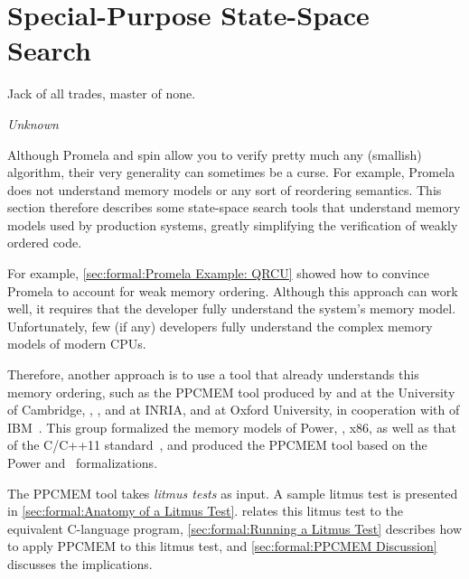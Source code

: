 
\section{Special-Purpose State-Space Search}
\label{sec:formal:Special-Purpose State-Space Search}
%
\epigraph{Jack of all trades, master of none.}{\emph{Unknown}}

Although Promela and spin allow you to verify pretty much any (smallish)
algorithm, their very generality can sometimes be a curse.
For example, Promela does not understand memory models or any sort
of reordering semantics.
This section therefore describes some state-space search tools that
understand memory models used by production systems, greatly simplifying the
verification of weakly ordered code.

For example,
\cref{sec:formal:Promela Example: QRCU}
showed how to convince Promela to account for weak memory ordering.
Although this approach can work well, it requires that the developer
fully understand the system's memory model.
Unfortunately, few (if any) developers fully understand the complex
memory models of modern CPUs.

Therefore, another approach is to use a tool that already understands
this memory ordering, such as the PPCMEM tool produced by
 and  at the University of Cambridge,
, , and
 at INRIA, and  at Oxford University,
in cooperation with  of
IBM~\cite{JadeAlglave2011ppcmem}.
This group formalized the memory models of Power, \ARM, x86, as well
as that of the C/C++11 standard~\cite{RichardSmith2019N4800}, and
produced the PPCMEM tool based on the Power and \ARM\ formalizations.

\QuickQuizEnd

The PPCMEM tool takes \emph{litmus tests} as input.
A sample litmus test is presented in
\cref{sec:formal:Anatomy of a Litmus Test}.
relates this litmus test to the equivalent C-language program,
\cref{sec:formal:Running a Litmus Test} describes how to
apply PPCMEM to this litmus test, and
\cref{sec:formal:PPCMEM Discussion}
discusses the implications.

